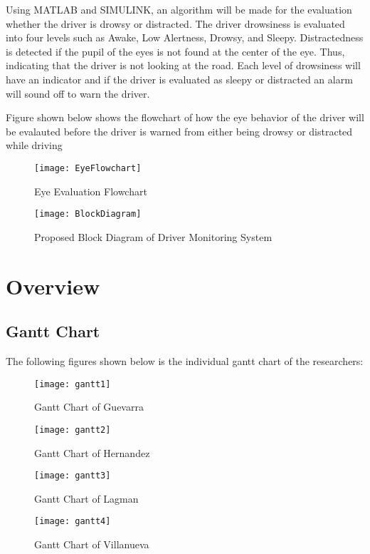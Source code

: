 Using MATLAB and SIMULINK, an algorithm will be made for the evaluation whether the driver is drowsy or distracted. The driver drowsiness is evaluated into four levels such as Awake, Low Alertness, Drowsy, and Sleepy. Distractedness is detected if the pupil of the eyes is not found at the center of the eye. Thus, indicating that the driver is not looking at the road. Each level of drowsiness will have an indicator and if the driver is evaluated as sleepy or distracted an alarm will sound off to warn the driver. 


Figure shown below shows the flowchart of how the eye behavior of the driver will be evalauted before the driver is warned from either being drowsy or distracted while driving
\begin{center}
\begin{figure}[ht]
	\centering
	\texttt{[image: EyeFlowchart]}
	\caption{Eye Evaluation Flowchart}
\end{figure}


\end{center}

\begin{center}
	\begin{figure}[ht]
		\centering
		\texttt{[image: BlockDiagram]}
		\caption{Proposed Block Diagram of Driver Monitoring System}
	\end{figure}
\end{center}
\newpage
\section{Overview}

\subsection{Gantt Chart}
The following figures shown below is the individual gantt chart of the researchers:

\begin{figure}[!htb]
	\centering
	\texttt{[image: gantt1]}
	\caption{Gantt Chart of Guevarra}
\end{figure}
\begin{figure}[!htb]
	\centering
	\texttt{[image: gantt2]}
	\caption{Gantt Chart of Hernandez}
\end{figure}
\begin{figure}[!htb]
	\centering
	\texttt{[image: gantt3]}
	\caption{Gantt Chart of Lagman}
\end{figure}
\begin{figure}[!htb]
	\centering
	\texttt{[image: gantt4]}
	\caption{Gantt Chart of Villanueva}
\end{figure}
\newpage
\newpage
